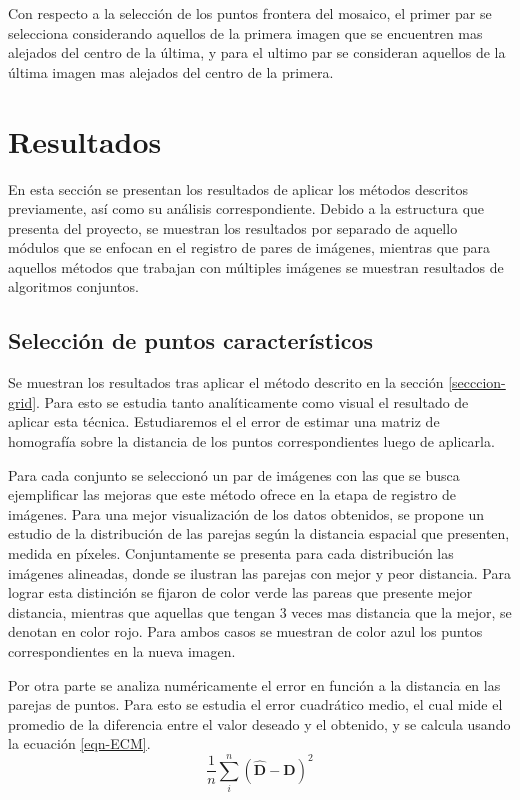 Con respecto  a la selección de los puntos frontera del mosaico, el primer par se selecciona considerando aquellos de la primera imagen que se encuentren mas alejados del centro de la última, y para el ultimo par se consideran aquellos de la última imagen mas alejados del centro de la primera.

\section{Resultados}

En esta sección se presentan los resultados de aplicar los métodos descritos previamente, así como su análisis correspondiente. Debido a la estructura que presenta del proyecto, se muestran los resultados por separado de aquello módulos que se enfocan en el registro de pares de imágenes, mientras que para aquellos métodos que trabajan con múltiples imágenes se muestran resultados de algoritmos conjuntos.

\subsection*{Selección de puntos característicos}

Se muestran los resultados tras aplicar el método descrito en la 
sección \ref{secccion-grid}. Para esto se estudia tanto analíticamente como visual el resultado de aplicar esta técnica. Estudiaremos el el error de estimar una matriz de homografía sobre la distancia de los puntos correspondientes luego de aplicarla. 

Para cada conjunto se seleccionó un par de imágenes con las que se busca ejemplificar las mejoras que este método ofrece en la etapa de registro de imágenes. Para una mejor visualización de los datos obtenidos, se propone un estudio de la distribución de las parejas según la distancia espacial que presenten, medida en píxeles. Conjuntamente se presenta para cada distribución las imágenes alineadas, donde se ilustran las parejas con mejor y peor distancia. Para lograr esta distinción se fijaron de color verde las pareas que presente mejor distancia, mientras que aquellas que tengan 3 veces mas distancia que la mejor, se denotan en color rojo. Para ambos casos se muestran de color azul los puntos correspondientes en la nueva imagen.

Por otra parte se analiza numéricamente el error en función a la distancia en las parejas de puntos. Para esto se estudia el error cuadrático medio, el cual mide el promedio de la diferencia entre el valor deseado y el obtenido, y se calcula usando la ecuación \ref{eqn-ECM}.
\begin{equation}\label{eqn-ECM}
	\frac{1}{n} \sum_{i}^{n} \left( \hat{\mathbf{D}} - \mathbf{D} \right)^2
\end{equation}

